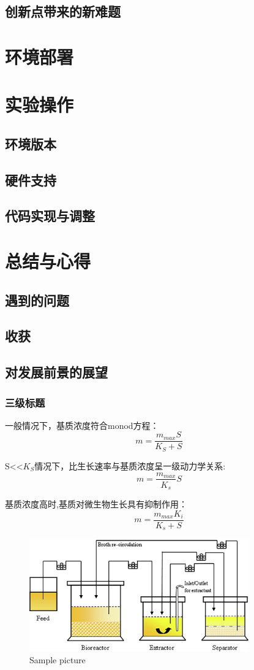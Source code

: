 \message{ !name(main.tex)}\documentclass[a4paper]{article}
\begin{document}
\subsection{创新点带来的新难题}
\section{环境部署}
\section{实验操作}
\subsection{环境版本}
\subsection{硬件支持}
\subsection{代码实现与调整}
\section{总结与心得}
\subsection{遇到的问题}
\subsection{收获}
\subsection{对发展前景的展望}
        \subsubsection{三级标题}
            一般情况下，基质浓度符合monod方程：
            $$m=\frac{m_{max}S}{K_S+S}$$

            S<<$K_S$情况下，比生长速率与基质浓度呈一级动力学关系:
            $$m=\frac{m_{max}}{K_s} S$$

            基质浓度高时,基质对微生物生长具有抑制作用：
            $$m=\frac{m_{max} K_i}{K_s+S}$$
           
            \begin{figure}[H]
                \centering%
                \includegraphics[width=9.5cm]{images/7.2.jpg}
                \caption{Sample picture}
                \label{fig1}%
            \end{figure}
\end{document}
